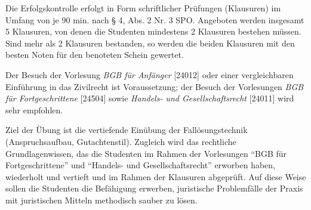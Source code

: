 \begin{course}

\setdoclanguagegerman
{}



\coursehead


\label{cour_4397.dp_997}


\begin{styleenv}
\begin{assessment}
Die Erfolgskontrolle erfolgt in Form schriftlicher Prüfungen (Klausuren) im Umfang von je 90 min. nach § 4, Abs. 2 Nr. 3 SPO. Angeboten werden insgesamt 5 Klausuren, von denen die Studenten mindestens 2 Klausuren bestehen müssen. Sind mehr als 2 Klausuren bestanden, so werden die beiden Klausuren mit den besten Noten für den benoteten Schein gewertet.


\end{assessment}

\begin{conditions}Der Besuch der Vorlesung \emph{BGB für Anfänger} [24012] oder einer vergleichbaren Einführung in das Zivilrecht ist Voraussetzung; der Besuch der Vorlesungen \emph{BGB für Fortgeschrittene} [24504] sowie \emph{Handels- und Gesellschaftsrecht} [24011] wird sehr empfohlen.

\end{conditions}


\end{styleenv}

\begin{learningoutcomes}
Ziel der Übung ist die vertiefende Einübung der Fallösungstechnik (Anspruchsaufbau, Gutachtenstil). Zugleich wird das rechtliche Grundlagenwissen, das die Studenten im Rahmen der Vorlesungen “BGB für Fortgeschrittene” und “Handels- und Gesellschaftsrecht” erworben haben, wiederholt und vertieft und im Rahmen der Klausuren abgeprüft. Auf diese Weise sollen die Studenten die Befähigung erwerben, juristische Problemfälle der Praxis mit juristischen Mitteln methodisch sauber zu lösen.



\end{learningoutcomes}
\end{course}
